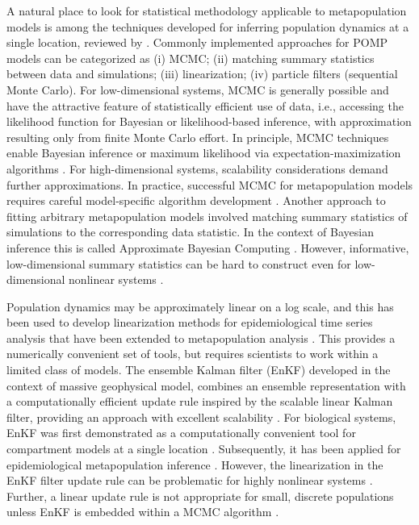 \documentclass[12pt]{article}\usepackage[]{graphicx}\usepackage[]{xcolor}
\begin{document}
A natural place to look for statistical methodology applicable to metapopulation models is among the techniques developed for inferring population dynamics at a single location, reviewed by \cite{funk20,auger-methe21}.
Commonly implemented approaches for POMP models can be categorized as  (i) MCMC; (ii) matching summary statistics between data and simulations; (iii)  linearization;   (iv) particle filters (sequential Monte Carlo). For low-dimensional systems, MCMC is generally possible and have the attractive feature of statistically efficient use of data, i.e., accessing the likelihood function for Bayesian or likelihood-based inference, with approximation resulting only from finite Monte Carlo effort.
In principle, MCMC techniques enable Bayesian inference or maximum likelihood via expectation-maximization algorithms \cite{cappe05}.
For high-dimensional systems, scalability considerations demand further approximations. 
In practice, successful MCMC for metapopulation models requires careful model-specific algorithm development \cite{whitehouse23}.
Another approach to fitting arbitrary metapopulation models involved matching summary statistics of simulations to the corresponding data statistic.
In the context of Bayesian inference this is called Approximate Bayesian Computing \cite{conlan12}.
However, informative, low-dimensional summary statistics can be hard to construct even for low-dimensional nonlinear systems \cite{fasiolo16,shrestha11}.

Population dynamics may be approximately linear on a log scale, and this has been used to develop linearization methods for epidemiological time series analysis \cite{bjornstad02} that have been extended to metapopulation analysis \cite{xia04}.
This provides a numerically convenient set of tools, but requires scientists to work within a limited class of models. The ensemble Kalman filter (EnKF) developed in the context of massive geophysical model, combines an ensemble representation with a computationally efficient update rule inspired by the scalable linear Kalman filter, providing an approach with excellent scalability \cite{evensen09book,evensen22}.
For biological systems, EnKF was first demonstrated as a computationally convenient tool for compartment models at a single location \cite{shaman12,yang14}.
Subsequently, it has been applied for epidemiological metapopulation inference \cite{li20,kramer20}.
However, the linearization in the EnKF filter update rule can be problematic for highly nonlinear systems \cite{evensen22}.
Further, a linear update rule is not appropriate for small, discrete populations unless EnKF is embedded within a MCMC algorithm \cite{katzfuss19}.
\end{document}
